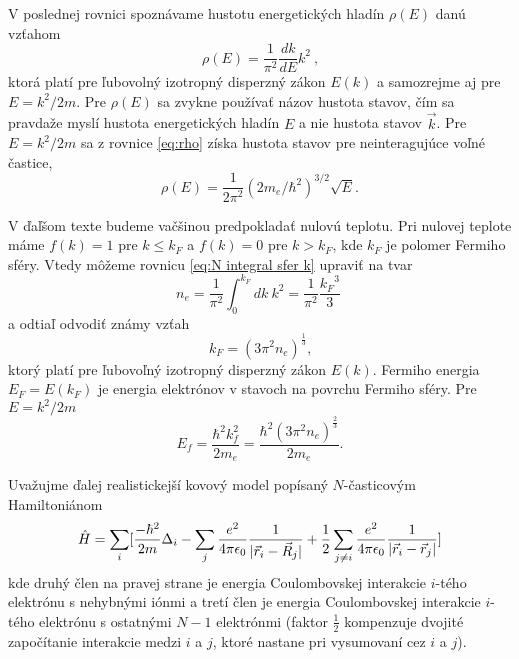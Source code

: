 V poslednej rovnici spoznávame hustotu energetických hladín $\rho(E)$ danú vzťahom
\begin{equation}
\label{eq:rho}
 \rho(E)=\frac{1}{\pi^2} \frac{dk}{dE} k^2  \ \text{,}
\end{equation}
ktorá platí pre ľubovolný izotropný disperzný zákon $E(k)$ a samozrejme aj pre $E = k^2/2m$.
Pre $\rho(E)$ sa zvykne používať názov hustota stavov, čím sa pravdaže
myslí hustota energetických hladín $E$ a nie hustota stavov $\vec k$.
Pre $E = k^2/2m$ sa z rovnice \eqref{eq:rho} získa
hustota stavov pre neinteragujúce voľné častice,
\begin{equation}
 \label{eq:rho_par}
 \rho(E)=\frac{1}{2\pi^2}{(2 m_e/\hbar^2)}^{3/2} \sqrt{E} \text{.}
\end{equation}


V ďaľšom texte
budeme vačšinou predpokladať nulovú teplotu.
Pri nulovej teplote máme $f(k)=1$ pre $k \leq k_F$ a $f(k)=0$ pre $k > k_F$,
kde $k_F$ je polomer Fermiho sféry. Vtedy môžeme rovnicu \eqref{eq:N integral sfer k} upraviť na tvar
\begin{equation}
 \label{eq:N integral sfer k nula}
 n_e =   \frac{1}{\pi^2} \int_0^{k_F} dk \ k^2  = \frac{1}{\pi^2} \frac{{k_F}^3}{3} \ \text{}
\end{equation}
a odtiaľ odvodiť známy vzťah
\begin{equation}
 \label{eq:kf}
 k_F=(3\pi^2 n_e)^{\frac{1}{3}}\text{,}
\end{equation}
ktorý platí pre ľubovoľný izotropný disperzný zákon $E(k)$.
Fermiho energia $E_F=E(k_F)$ je energia elektrónov v stavoch na povrchu Fermiho sféry. Pre $E = k^2/2m$
\begin{equation}
 \label{eq:ef}
 E_f=\frac{\hbar^2 k_f^2}{2m_e}=\frac{\hbar^2(3\pi^2 n_e)^{\frac{2}{3}}  }{2m_e} \text{.}
\end{equation}

Uvažujme ďalej realistickejší kovový model popísaný $N$-časticovým Hamiltoniánom
\begin{equation}
\label{eq:hrtf_ham}
\hat{H}=\sum_i [ \frac{-\hbar^2}{2m}\Delta_i  -\sum_j\frac{e^2}{4\pi \epsilon_0}{\frac{1}{|\vec{r}_i-\vec{R}_j|}} +\frac{1}{2}\sum_{j\neq i}\frac{e^2}{4\pi\epsilon_0}\frac{1}{|\vec{r}_i-\vec{r}_j|} ]
\end{equation}
kde druhý člen na pravej strane je energia Coulombovskej interakcie $i$-tého elektrónu s nehybnými iónmi a tretí člen je energia Coulombovskej interakcie $i$-tého elektrónu s ostatnými $N-1$ elektrónmi (faktor $\frac{1}{2}$ kompenzuje dvojité započítanie interakcie
medzi $i$ a $j$, ktoré nastane pri vysumovaní cez $i$ a $j$).

